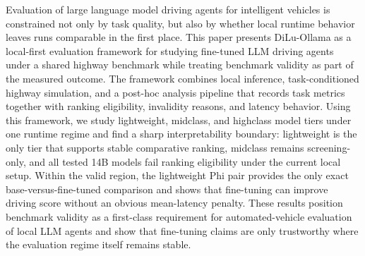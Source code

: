 Evaluation of large language model driving agents for intelligent vehicles is constrained not only by task quality, but also by whether local runtime behavior leaves runs comparable in the first place. This paper presents DiLu-Ollama as a local-first evaluation framework for studying fine-tuned LLM driving agents under a shared highway benchmark while treating benchmark validity as part of the measured outcome. The framework combines local inference, task-conditioned highway simulation, and a post-hoc analysis pipeline that records task metrics together with ranking eligibility, invalidity reasons, and latency behavior. Using this framework, we study lightweight, midclass, and highclass model tiers under one runtime regime and find a sharp interpretability boundary: lightweight is the only tier that supports stable comparative ranking, midclass remains screening-only, and all tested 14B models fail ranking eligibility under the current local setup. Within the valid region, the lightweight Phi pair provides the only exact base-versus-fine-tuned comparison and shows that fine-tuning can improve driving score without an obvious mean-latency penalty. These results position benchmark validity as a first-class requirement for automated-vehicle evaluation of local LLM agents and show that fine-tuning claims are only trustworthy where the evaluation regime itself remains stable.
